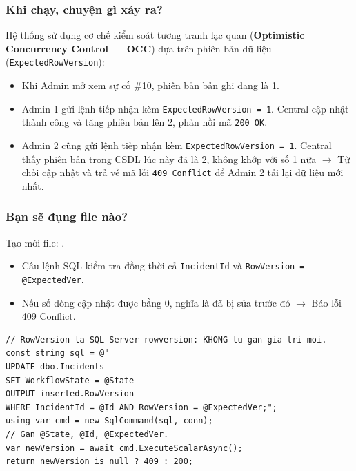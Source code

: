 \documentclass[12pt,a4paper]{article}
\begin{document}
\subsubsection{Khi chạy, chuyện gì xảy ra?}
Hệ thống sử dụng cơ chế kiểm soát tương tranh lạc quan (\textbf{Optimistic Concurrency Control — OCC}) dựa trên phiên bản dữ liệu (\texttt{ExpectedRowVersion}):
\begin{itemize}
  \item Khi Admin mở xem sự cố \#10, phiên bản bản ghi đang là 1.
  \item Admin 1 gửi lệnh tiếp nhận kèm \texttt{ExpectedRowVersion = 1}. Central cập nhật thành công và tăng phiên bản lên 2, phản hồi mã \texttt{200 OK}.
  \item Admin 2 cũng gửi lệnh tiếp nhận kèm \texttt{ExpectedRowVersion = 1}. Central thấy phiên bản trong CSDL lúc này đã là 2, không khớp với số 1 nữa $\rightarrow$ Từ chối cập nhật và trả về mã lỗi \texttt{409 Conflict} để Admin 2 tải lại dữ liệu mới nhất.
\end{itemize}

\subsubsection{Bạn sẽ đụng file nào?}
Tạo mới file: .

\begin{orientationbox}
\begin{itemize}[leftmargin=1.5em, itemsep=1pt]
  \item Câu lệnh SQL kiểm tra đồng thời cả \texttt{IncidentId} và \texttt{RowVersion = @ExpectedVer}.
  \item Nếu số dòng cập nhật được bằng 0, nghĩa là đã bị sửa trước đó $\rightarrow$ Báo lỗi 409 Conflict.
\end{itemize}
\end{orientationbox}

\begin{lstlisting}[language=CSharp, caption={Pseudocode minh họa: Cập nhật sự cố với khóa lạc quan OCC}]
// RowVersion la SQL Server rowversion: KHONG tu gan gia tri moi.
const string sql = @"
UPDATE dbo.Incidents
SET WorkflowState = @State
OUTPUT inserted.RowVersion
WHERE IncidentId = @Id AND RowVersion = @ExpectedVer;";
using var cmd = new SqlCommand(sql, conn);
// Gan @State, @Id, @ExpectedVer.
var newVersion = await cmd.ExecuteScalarAsync();
return newVersion is null ? 409 : 200;
\end{lstlisting}
\end{document}
